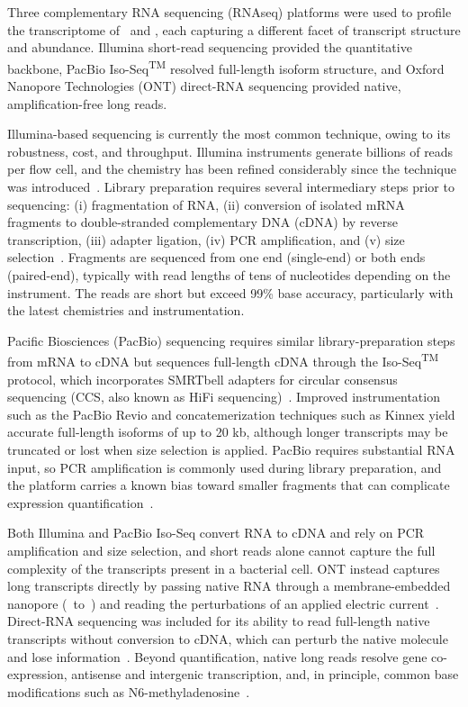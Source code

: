 Three complementary RNA sequencing (RNAseq) platforms were used to profile the transcriptome of \syn~and \syna, each capturing a different facet of transcript structure and abundance.
Illumina short-read sequencing provided the quantitative backbone, PacBio Iso-Seq\textsuperscript{TM} resolved full-length isoform structure, and Oxford Nanopore Technologies (ONT) direct-RNA sequencing provided native, amplification-free long reads.

Illumina-based sequencing is currently the most common technique, owing to its robustness, cost, and throughput.
Illumina instruments generate billions of reads per flow cell, and the chemistry has been refined considerably since the technique was introduced~\cite{mortazavi_mapping_2008}.
Library preparation requires several intermediary steps prior to sequencing: (i) fragmentation of RNA, (ii) conversion of isolated mRNA fragments to double-stranded complementary DNA (cDNA) by reverse transcription, (iii) adapter ligation, (iv) PCR amplification, and (v) size selection~\cite{stark_rna_2019}.
Fragments are sequenced from one end (single-end) or both ends (paired-end), typically with read lengths of tens of nucleotides depending on the instrument.
The reads are short but exceed 99\% base accuracy, particularly with the latest chemistries and instrumentation.

Pacific Biosciences (PacBio) sequencing requires similar library-preparation steps from mRNA to cDNA but sequences full-length cDNA through the Iso-Seq\textsuperscript{TM} protocol, which incorporates SMRTbell adapters for circular consensus sequencing (CCS, also known as HiFi sequencing)~\cite{wenger_accurate_2019}.
Improved instrumentation such as the PacBio Revio and concatemerization techniques such as Kinnex yield accurate full-length isoforms of up to 20 kb, although longer transcripts may be truncated or lost when size selection is applied.
PacBio requires substantial RNA input, so PCR amplification is commonly used during library preparation, and the platform carries a known bias toward smaller fragments that can complicate expression quantification~\cite{rhoads_pacbio_2015}.

Both Illumina and PacBio Iso-Seq convert RNA to cDNA and rely on PCR amplification and size selection, and short reads alone cannot capture the full complexity of the transcripts present in a bacterial cell.
ONT instead captures long transcripts directly by passing native RNA through a membrane-embedded nanopore (\threeprime~to~\fiveprime) and reading the perturbations of an applied electric current~\cite{garalde_highly_2018}.
Direct-RNA sequencing was included for its ability to read full-length native transcripts without conversion to cDNA, which can perturb the native molecule and lose information~\cite{soneson_comprehensive_2019}.
Beyond quantification, native long reads resolve gene co-expression, antisense and intergenic transcription, and, in principle, common base modifications such as N6-methyladenosine~\cite{liu_accurate_2019}.
